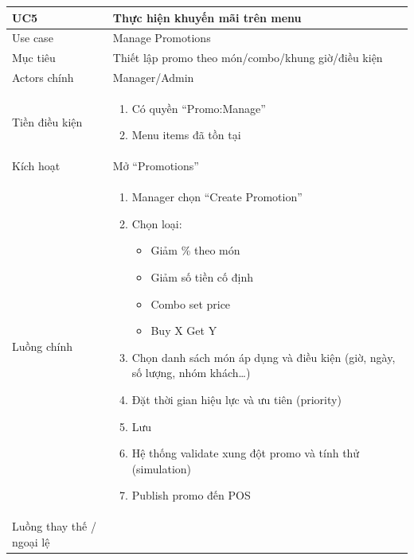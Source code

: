 \begin{longtable}{|>{\raggedright\arraybackslash}p{}|>{\raggedright\arraybackslash}p{}|}
\hline
\textbf{UC5} & \textbf{Thực hiện khuyến mãi trên menu} \\
\hline
Use case & Manage Promotions \\
\hline
Mục tiêu & Thiết lập promo theo món/combo/khung giờ/điều kiện \\
\hline
Actors chính & Manager/Admin \\
\hline
Tiền điều kiện &
\vspace{-0.5em}
\begin{enumerate}[leftmargin=*]
\item Có quyền “Promo:Manage”
\item Menu items đã tồn tại
\end{enumerate}
\vspace{-0.5em}
\\
\hline
Kích hoạt & Mở “Promotions” \\
\hline
Luồng chính &
\vspace{-0.5em}
\begin{enumerate}[leftmargin=*]
\item Manager chọn “Create Promotion”
\item Chọn loại:
\vspace{-0.5em}
\begin{itemize}[leftmargin=*]
\item Giảm \% theo món
\item Giảm số tiền cố định
\item Combo set price
\item Buy X Get Y
\end{itemize}
\vspace{-0.5em}
\item Chọn danh sách món áp dụng và điều kiện (giờ, ngày, số lượng, nhóm khách…)
\item Đặt thời gian hiệu lực và ưu tiên (priority)
\item Lưu
\item Hệ thống validate xung đột promo và tính thử (simulation)
\item Publish promo đến POS
\end{enumerate}
\vspace{-0.5em}
\\
\hline
Luồng thay thế / ngoại lệ &
\vspace{-0.5em}

\end{longtable}
